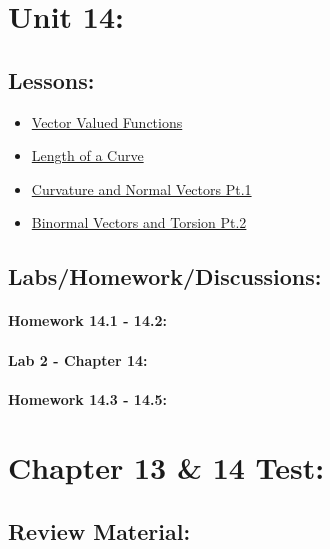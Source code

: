 \documentclass[9pt]{amsart}
\begin{document}
\section{Unit 14:}
    \subsection{Lessons:}
        \begin{itemize}
            \item \href{https://www.youtube.com/watch?v=HBRli7Jv_Ng&list=PLVOT1I6lLvjfDhACPSMXam2diM0IBR3hl&index=4}{Vector Valued Functions}
            \item \href{https://www.youtube.com/watch?v=gz-bhgt3NbQ&list=PLVOT1I6lLvjfDhACPSMXam2diM0IBR3hl&index=5}{Length of a Curve}
            \item \href{https://www.youtube.com/watch?v=hUq-uHI7Mpw&list=PLVOT1I6lLvjfDhACPSMXam2diM0IBR3hl&index=6}{Curvature and Normal Vectors Pt.1}
            \item \href{https://www.youtube.com/watch?v=eLPrbhmgC0g&list=PLVOT1I6lLvjfDhACPSMXam2diM0IBR3hl&index=7a}{Binormal Vectors and Torsion Pt.2}
        \end{itemize}
    
    \subsection{Labs/Homework/Discussions:}
        \paragraph{Homework 14.1 - 14.2:}
            
        \newpage    
        \paragraph{Lab 2 - Chapter 14:}
            

        \paragraph{Homework 14.3 - 14.5:}
            

\section{Chapter 13 \& 14 Test:}
    \subsection{Review Material:}
\end{document}
